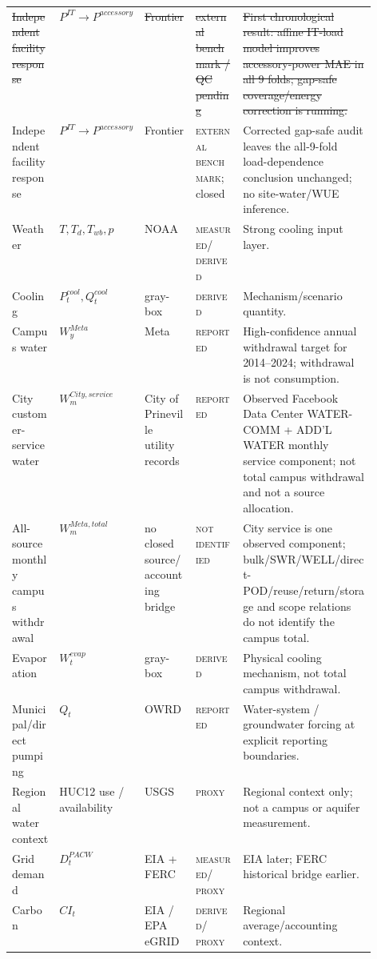 \documentclass[11pt]{article}
\newcommand{\oldtxt}[1]{\textcolor{blue!70!black}{\sout{#1}}}
\newcommand{\latesttxt}[1]{\textcolor{purple!85!black}{#1}}
\newcommand{\Reported}{\textsc{reported}}
\newcommand{\Measured}{\textsc{measured}}
\newcommand{\Derived}{\textsc{derived}}
\newcommand{\Proxy}{\textsc{proxy}}
\newcommand{\Benchmark}{\textsc{external benchmark}}
\newcommand{\NotIdentified}{\textsc{not identified}}
\begin{document}
\begin{center}
\begin{tabularx}{\linewidth}{@{}p{0.13\linewidth}p{0.13\linewidth}p{0.14\linewidth}p{0.13\linewidth}Y@{}}
\oldtxt{Independent facility response} & \oldtxt{\(P^{IT}\rightarrow P^{accessory}\)} & \oldtxt{Frontier \cite{frontier2024}} & \oldtxt{external benchmark / QC pending} & \oldtxt{First chronological result: affine IT-load model improves accessory-power MAE in all 9 folds; gap-safe coverage/energy correction is running.} \\
\latesttxt{Independent facility response} & \latesttxt{\(P^{IT}\rightarrow P^{accessory}\)} & \latesttxt{Frontier \cite{frontier2024}} & \latesttxt{\Benchmark; closed} & \latesttxt{Corrected gap-safe audit leaves the all-9-fold load-dependence conclusion unchanged; no site-water/WUE inference.} \\
Weather & \(T,T_d,T_{wb},p\) & NOAA & \Measured / \Derived & Strong cooling input layer. \\
Cooling & \(P^{cool}_t,Q^{cool}_t\) & gray-box & \Derived & Mechanism/scenario quantity. \\
Campus water & \(W^{Meta}_y\) & Meta & \Reported & High-confidence annual withdrawal target for 2014--2024; withdrawal is not consumption. \\
\latesttxt{City customer-service water} & \latesttxt{\(W^{City,service}_m\)} & \latesttxt{City of Prineville utility records} & \latesttxt{\Reported} & \latesttxt{Observed Facebook Data Center WATER-COMM + ADD'L WATER monthly service component; not total campus withdrawal and not a source allocation.} \\
\latesttxt{All-source monthly campus withdrawal} & \latesttxt{\(W^{Meta,total}_m\)} & \latesttxt{no closed source/accounting bridge} & \latesttxt{\NotIdentified} & \latesttxt{City service is one observed component; bulk/SWR/WELL/direct-POD/reuse/return/storage and scope relations do not identify the campus total.} \\
Evaporation & \(W^{evap}_t\) & gray-box & \Derived & Physical cooling mechanism, not total campus withdrawal. \\
Municipal/direct pumping & \(Q_t\) & OWRD & \Reported & Water-system / groundwater forcing at explicit reporting boundaries. \\
Regional water context & HUC12 use / availability & USGS & \Proxy & Regional context only; not a campus or aquifer measurement. \\
Grid demand & \(D^{PACW}_t\) & EIA + FERC & \Measured / \Proxy & EIA later; FERC historical bridge earlier. \\
Carbon & \(CI_t\) & EIA / EPA eGRID & \Derived / \Proxy & Regional average/accounting context. \\

\end{tabularx}
\end{center}
\end{document}
